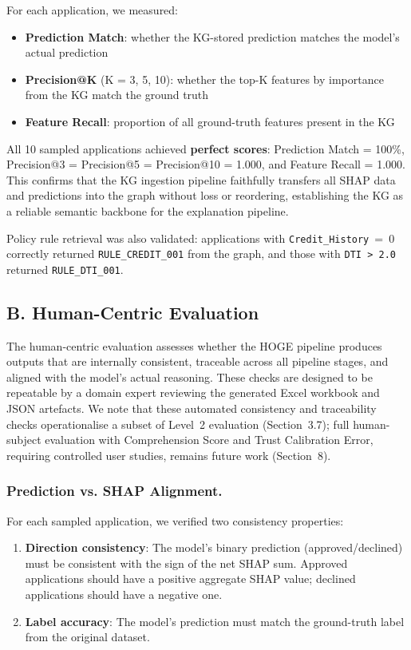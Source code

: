 \documentclass[lnbip]{svmultln}
\begin{document}
For each application, we measured:

\begin{itemize}
    \item \textbf{Prediction Match}: whether the KG-stored prediction matches the model's actual prediction
    \item \textbf{Precision@K} (K = 3, 5, 10): whether the top-K features by importance from the KG match the ground truth
    \item \textbf{Feature Recall}: proportion of all ground-truth features present in the KG
\end{itemize}

All 10 sampled applications achieved \textbf{perfect scores}: Prediction Match = 100\%, Precision@3 = Precision@5 = Precision@10 = 1.000, and Feature Recall = 1.000. This confirms that the KG ingestion pipeline faithfully transfers all SHAP data and predictions into the graph without loss or reordering, establishing the KG as a reliable semantic backbone for the explanation pipeline.

Policy rule retrieval was also validated: applications with \texttt{Credit\_History}~=~0 correctly returned \texttt{RULE\_CREDIT\_001} from the graph, and those with \texttt{DTI~>~2.0} returned \texttt{RULE\_DTI\_001}.


\subsection{B. Human-Centric Evaluation}

The human-centric evaluation assesses whether the HOGE pipeline produces outputs that are internally consistent, traceable across all pipeline stages, and aligned with the model's actual reasoning. These checks are designed to be repeatable by a domain expert reviewing the generated Excel workbook and JSON artefacts. We note that these automated consistency and traceability checks operationalise a subset of Level~2 evaluation (Section~3.7); full human-subject evaluation with Comprehension Score and Trust Calibration Error, requiring controlled user studies, remains future work (Section~8).

\subsubsection{Prediction vs. SHAP Alignment.}

For each sampled application, we verified two consistency properties:
\begin{enumerate}
    \item \textbf{Direction consistency}: The model's binary prediction (approved/declined) must be consistent with the sign of the net SHAP sum. Approved applications should have a positive aggregate SHAP value; declined applications should have a negative one.
    \item \textbf{Label accuracy}: The model's prediction must match the ground-truth label from the original dataset.
\end{enumerate}
\end{document}
